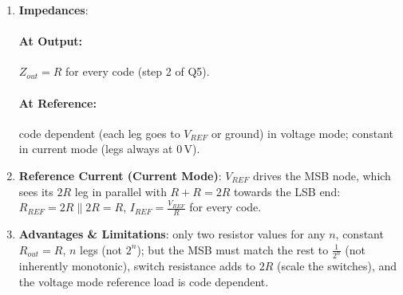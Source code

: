 \begin{enumerate}
    midscale transition \(0111\ldots \to 1000\ldots\) needs the MSB leg to match
    the sum of all others to \(\frac{1}{2^n}\). At the output node the leg
    (conductance \(G_M\), relative resistor error \(e_M\)) and the rest of the
    ladder (\(G_r\), error \(e_r\)) form the weight \(w\) of \(b_{n-1}\):
    \begin{align*}
      V_{OUT} &= w\, b_{n-1} V_{REF} + (1 - w) V_{th,n-2}, \hspace{1cm}
      w = \frac{G_M}{G_M + G_r}, \hspace{0.5cm} G_M = \frac{G}{1 + e_M},\ G_r = \frac{G}{1 + e_r} \\
      dw &= \frac{G_r\, dG_M - G_M\, dG_r}{(G_M + G_r)^2} = \frac{G(-e_M G) - G(-e_r G)}{4G^2} = \frac{e_r - e_M}{4}
    \end{align*}
    \(V_{OUT}(1000\ldots) = w V_{REF}\) rises by \(dw\, V_{REF}\) and
    \(V_{OUT}(0111\ldots) = (1 - w) V_{th,n-2} \approx (1 - w) V_{REF}\) falls by
    \(dw\, V_{REF}\), so the step changes by \(2\, dw\, V_{REF}\):
    \begin{align*}
      DNL_{N/2 - 1} &= \frac{2\, dw\, V_{REF}}{V_{REF}/2^n} = 2^{n+1} \frac{e_r - e_M}{4} = 2^{n-1}(e_r - e_M) \\
      SD(DNL_{N/2 - 1}) &= 2^{n-1}\sqrt{2}\, S_R < 1 \hspace{0.5cm} \Rightarrow \hspace{0.5cm} S_R < \frac{\sqrt{2}}{2^n}
    \end{align*}
    so \(S_R \lesssim \frac{1}{2^n}\) for \(|DNL| < 1\)
    (switch resistance must be scaled or included in each \(2R\)).
  \item \textbf{Impedances}:
    \paragraph{At Output:} \(Z_{out} = R\) for every code (step 2 of Q5).
    \paragraph{At Reference:} code dependent (each leg goes to \(V_{REF}\) or ground) in voltage
    mode; constant in current mode (legs always at 0\,V).
  \item \textbf{Reference Current (Current Mode)}: \(V_{REF}\) drives the MSB node, which sees its \(2R\) leg in parallel
    with \(R + R = 2R\) towards the LSB end: \(R_{REF} = 2R \parallel 2R = R\), \(I_{REF} = \frac{V_{REF}}{R}\) for every code.
  \item \textbf{Advantages \& Limitations}: only two resistor values for any \(n\), constant
    \(R_{out} = R\), \(n\) legs (not \(2^n\)); but the MSB must match the rest to \(\frac{1}{2^n}\) (not inherently
    monotonic), switch resistance adds to \(2R\) (scale the switches), and the voltage mode reference
    load is code dependent.
\end{enumerate}

